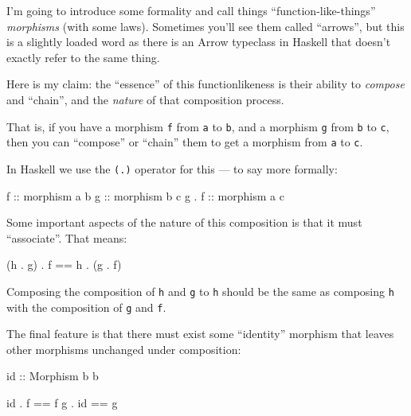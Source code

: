 \documentclass[]{article}
\newenvironment{Shaded}{}{}
\newcommand{\DataTypeTok}[1]{\textcolor[rgb]{0.56,0.13,0.00}{{#1}}}
\newcommand{\OtherTok}[1]{\textcolor[rgb]{0.00,0.44,0.13}{{#1}}}
\newcommand{\FunctionTok}[1]{\textcolor[rgb]{0.02,0.16,0.49}{{#1}}}
\newcommand{\NormalTok}[1]{{#1}}
\begin{document}
I'm going to introduce some formality and call things ``function-like-things''
\emph{morphisms} (with some laws). Sometimes you'll see them called ``arrows'',
but this is a slightly loaded word as there is an Arrow typeclass in Haskell
that doesn't exactly refer to the same thing.

Here is my claim: the ``essence'' of this functionlikeness is their ability to
\emph{compose} and ``chain'', and the \emph{nature} of that composition process.

That is, if you have a morphism \texttt{f} from \texttt{a} to \texttt{b}, and a
morphism \texttt{g} from \texttt{b} to \texttt{c}, then you can ``compose'' or
``chain'' them to get a morphism from \texttt{a} to \texttt{c}.

In Haskell we use the \texttt{(.)} operator for this --- to say more formally:

\begin{Shaded}
\begin{Highlighting}[]
\OtherTok{f     ::} \NormalTok{morphism a b}
\OtherTok{g     ::} \NormalTok{morphism b c}
\NormalTok{g }\FunctionTok{.}\OtherTok{ f ::} \NormalTok{morphism a c}
\end{Highlighting}
\end{Shaded}

Some important aspects of the nature of this composition is that it must
``associate''. That means:

\begin{Shaded}
\begin{Highlighting}[]
\NormalTok{(h }\FunctionTok{.} \NormalTok{g) }\FunctionTok{.} \NormalTok{f }\FunctionTok{==} \NormalTok{h }\FunctionTok{.} \NormalTok{(g }\FunctionTok{.} \NormalTok{f)}
\end{Highlighting}
\end{Shaded}

Composing the composition of \texttt{h} and \texttt{g} to \texttt{h} should be
the same as composing \texttt{h} with the composition of \texttt{g} and
\texttt{f}.

The final feature is that there must exist some ``identity'' morphism that
leaves other morphisms unchanged under composition:

\begin{Shaded}
\begin{Highlighting}[]
\NormalTok{id}\OtherTok{ ::} \DataTypeTok{Morphism} \NormalTok{b b}

\NormalTok{id }\FunctionTok{.} \NormalTok{f  }\FunctionTok{==} \NormalTok{f}
\NormalTok{g  }\FunctionTok{.} \NormalTok{id }\FunctionTok{==} \NormalTok{g}
\end{Highlighting}
\end{Shaded}
\end{document}
